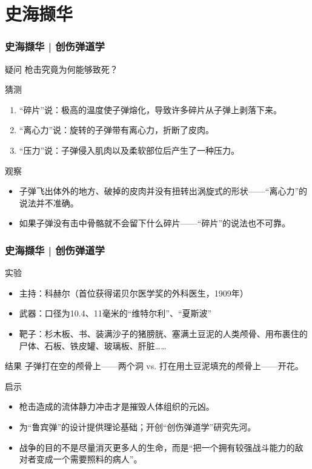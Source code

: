 \section{史海撷华}
\begin{frame}
  \frametitle{史海撷华 | 创伤弹道学}
  \begin{block}{疑问}
    枪击究竟为何能够致死？
  \end{block}
  \pause
  \begin{block}{猜测}
    \begin{enumerate}
      \item “碎片”说：极高的温度使子弹熔化，导致许多碎片从子弹上剥落下来。
      \item “离心力”说：旋转的子弹带有离心力，折断了皮肉。
      \item “压力”说：子弹侵入肌肉以及柔软部位后产生了一种压力。
    \end{enumerate}
  \end{block}
  \pause
  \begin{block}{观察}
    \begin{itemize}
      \item 子弹飞出体外的地方、破掉的皮肉并没有扭转出涡旋式的形状——“离心力”的说法并不准确。
      \item 如果子弹没有击中骨骼就不会留下什么碎片——“碎片”的说法也不可靠。
    \end{itemize}
  \end{block}
\end{frame}

\begin{frame}
  \frametitle{史海撷华 | 创伤弹道学}
  \begin{block}{实验}
    \begin{itemize}
      \item 主持：科赫尔（首位获得诺贝尔医学奖的外科医生，1909年）
      \item 武器：口径为10.4、11毫米的“维特尔利”、“夏斯波”
      \item 靶子：杉木板、书、装满沙子的猪膀胱、塞满土豆泥的人类颅骨、用布裹住的尸体、石板、铁皮罐、玻璃板、肝脏……
    \end{itemize}
  \end{block}
  \vspace{-0.3em}
  \pause
  \begin{block}{结果}
     子弹打在空的颅骨上——两个洞 vs. 打在用土豆泥填充的颅骨上——开花。
  \end{block}
  \vspace{-0.3em}
  \pause
  \begin{block}{启示}
    \begin{itemize}
      \item \alert{枪击造成的流体静力冲击才是摧毁人体组织的元凶。}
      \item 为“鲁宾弹”的设计提供理论基础；开创\alert{“创伤弹道学”}研究先河。
      \item \alert{战争的目的}不是尽量消灭更多人的生命，而是“把一个拥有较强战斗能力的敌对者变成一个需要照料的病人”。
    \end{itemize}
  \end{block}
\end{frame}

